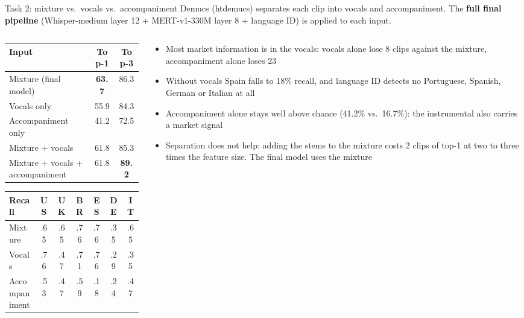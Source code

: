 \documentclass[aspectratio=169,11pt]{beamer}
\newcommand{\best}[1]{\textbf{\alert{#1}}}                       %
\newenvironment{tight}{\begin{itemize}\setlength{\itemsep}{1.5pt}\setlength{\parskip}{0pt}\setlength{\topsep}{0pt}}{\end{itemize}}
\begin{document}
\begin{frame}[t]{Task 2: mixture vs.\ vocals vs.\ accompaniment}
  \small
  Demucs (htdemucs) separates each clip into vocals and accompaniment. The \textbf{full final pipeline} (Whisper-medium layer 12 + MERT-v1-330M layer 8 + language ID) is applied to each input.
  \vspace{0.1em}

  \begin{columns}[T]
    \begin{column}{0.5\textwidth}
      {\footnotesize\setlength{\tabcolsep}{4pt}
      \begin{tabular}{@{}lcc@{}}
        \toprule
        Input & Top-1 & Top-3 \\ \midrule
        Mixture (final model) & \best{63.7} & 86.3 \\
        Vocals only & 55.9 & 84.3 \\
        Accompaniment only & 41.2 & 72.5 \\
        Mixture + vocals & 61.8 & 85.3 \\
        Mixture + vocals + accompaniment & 61.8 & \best{89.2} \\
        \bottomrule
      \end{tabular}}

      \vspace{0.6em}
      {\footnotesize\setlength{\tabcolsep}{3.5pt}
      \begin{tabular}{@{}lcccccc@{}}
        \toprule
        Recall & US & UK & BR & ES & DE & IT \\ \midrule
        Mixture       & .65 & .65 & .76 & .76 & .35 & .65 \\
        Vocals        & .76 & .47 & .71 & .76 & .29 & .35 \\
        Accompaniment & .53 & .47 & .59 & \alert{.18} & .24 & .47 \\
        \bottomrule
      \end{tabular}}
    \end{column}
    \begin{column}{0.5\textwidth}
      \begin{tight}\footnotesize
        \item \alert{Most market information is in the vocals}: vocals alone lose 8 clips against the mixture, accompaniment alone loses 23
        \item Without vocals Spain falls to 18\% recall, and language ID detects no Portuguese, Spanish, German or Italian at all
        \item Accompaniment alone stays well above chance (41.2\% vs.\ 16.7\%): the instrumental also carries a market signal
        \item Separation does not help: adding the stems to the mixture costs 2 clips of top-1 at two to three times the feature size. The final model uses the mixture
      \end{tight}
    \end{column}
  \end{columns}
\end{frame}
\end{document}
